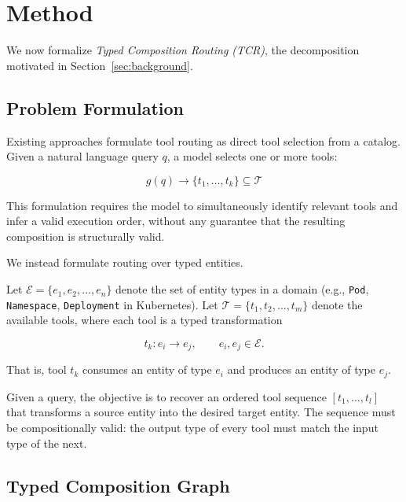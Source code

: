 \section{Method}
\label{sec:method}

We now formalize \emph{Typed Composition Routing (TCR)}, the decomposition motivated in Section~\ref{sec:background}.

\subsection{Problem Formulation}
\label{sec:problem-def}

Existing approaches formulate tool routing as direct tool selection from a catalog.
Given a natural language query $q$, a model selects one or more tools:

\begin{equation}
    g(q) \rightarrow \{t_1, \ldots, t_k\} \subseteq \mathcal{T}
\end{equation}

This formulation requires the model to simultaneously identify relevant tools and infer a valid execution order, without any guarantee that the resulting composition is structurally valid.

We instead formulate routing over typed entities.

Let $\mathcal{E} = \{e_1, e_2, \ldots, e_n\}$ denote the set of entity types in a domain (e.g., \texttt{Pod}, \texttt{Namespace}, \texttt{Deployment} in Kubernetes).
Let $\mathcal{T} = \{t_1, t_2, \ldots, t_m\}$ denote the available tools, where each tool is a typed transformation

\begin{equation}
    t_k : e_i \rightarrow e_j,
    \qquad
    e_i,e_j \in \mathcal{E}.
    \label{eq:tool-transform}
\end{equation}

That is, tool $t_k$ consumes an entity of type $e_i$ and produces an entity of type $e_j$.

Given a query, the objective is to recover an ordered tool sequence
$[t_1,\ldots,t_l]$
that transforms a source entity into the desired target entity.
The sequence must be compositionally valid: the output type of every tool must match the input type of the next.

\subsection{Typed Composition Graph}
\label{sec:typed-graph}

